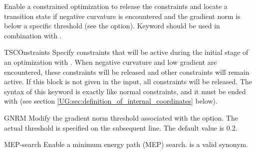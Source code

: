 \begin{keywordlist}
Enable a constrained optimization to release the constraints and locate
a transition state if negative curvature is encountered and the
gradient norm is below a specific threshold (see the  option).
Keyword  should be used in combination with .
\item[TSCOnstraints]
Specify constraints that will be active during the initial stage of an
optimization with . When negative curvature and low
gradient are encountered, these constraints will be released and
other constraints will remain active. If this block is not given in
the input, all constraints will be released. The syntax of this
keyword is exactly like normal constraints, and it must be ended with
(see section \ref{UG:sec:definition_of_internal_coordinates} below).
\item[GNRM]
Modify the gradient norm threshold associated with the  option.
The actual threshold is specified on the subsequent line. The default
value is 0.2.
\item[MEP-search]
%
Enable a minimum energy path (MEP) search.  is a valid synonym.

\end{keywordlist}
